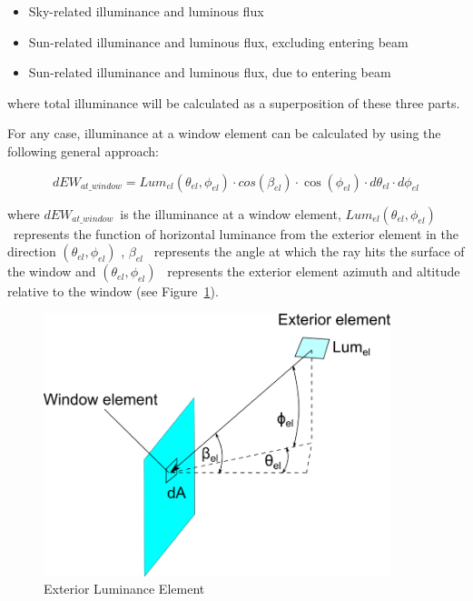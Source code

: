 \begin{itemize}
\item
  Sky-related illuminance and luminous flux
\item
  Sun-related illuminance and luminous flux, excluding entering beam
\item
  Sun-related illuminance and luminous flux, due to entering beam
\end{itemize}

where total illuminance will be calculated as a superposition of these three parts.

For any case, illuminance at a window element can be calculated by using the following general approach:

\begin{equation}
dE{W_{at\_window}} = Lu{m_{el}}({\theta_{el}},{\phi_{el}}) \cdot cos({\beta_{el}}) \cdot \cos ({\phi_{el}}) \cdot d{\theta_{el}} \cdot d{\phi_{el}}
\label{eq:IlluminanceAtWindowElement}
\end{equation}

where \(dE{W_{at\_window}}\)~is the illuminance at a window element, \(Lu{m_{el}}({\theta_{el}},{\phi_{el}})\)~represents the function of horizontal luminance from the exterior element in the direction \(({\theta_{el}},{\phi_{el}})\) , \({\beta_{el}}\) ~represents the angle at which the ray hits the surface of the window and \(({\theta_{el}},{\phi_{el}})\) ~represents the exterior element azimuth and altitude relative to the window (see Figure~\ref{fig:exterior-luminance-element}).

\begin{figure}[hbtp] %
\centering
\includegraphics[width=0.9\textwidth, height=0.9\textheight, keepaspectratio=true]{media/image834.png}
\caption{Exterior Luminance Element \protect \label{fig:exterior-luminance-element}}
\end{figure}

